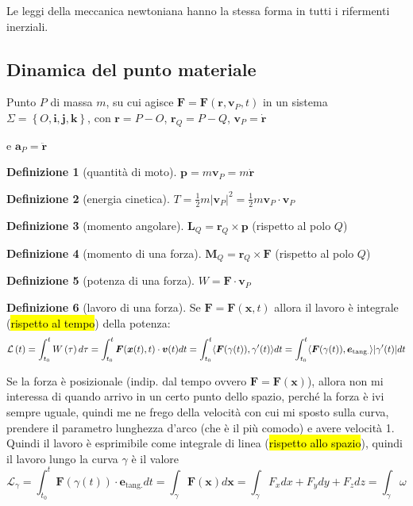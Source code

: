 \documentclass[a4paper,10pt]{article}
\theoremstyle{definition}
\newcommand{\bv}{\boldsymbol} %
\theoremstyle{indentdefinition}
\newtheorem{defn}{Definizione}[section]
\theoremstyle{indenttheorem}
\theoremstyle{myremark}
\theoremstyle{indentgeneral}
\begin{document}
Le leggi della meccanica newtoniana hanno la stessa forma in tutti
i rifermenti inerziali.

\subsection{Dinamica del punto materiale}

Punto $P$ di massa $m$, su cui agisce $\boldsymbol{F}=\boldsymbol{F}\left(\boldsymbol{r},\boldsymbol{v}_{P},t\right)$
in un sistema $\Sigma=\left\{ O,\boldsymbol{i},\boldsymbol{j},\boldsymbol{k}\right\} $,
con $\boldsymbol{r}=P-O$, $\boldsymbol{r}_Q=P-Q$, $\boldsymbol{v}_{P}=\dot{\boldsymbol{r}}$ 

e $\boldsymbol{a}_{P}=\ddot{\boldsymbol{r}}$
\begin{defn}[quantità di moto]
\label{def:quantita-di-moto}$\boldsymbol{p}=m\boldsymbol{v}_{P}=m\dot{\boldsymbol{r}}$
\end{defn}

\begin{defn}[energia cinetica]
\label{def:energia-cinetica}$T=\frac{1}{2}m\left|\boldsymbol{v}_{P}\right|^{2}=\frac{1}{2}m\boldsymbol{v}_{P}\cdot\boldsymbol{v}_{P}$
\end{defn}

\begin{defn}[momento angolare]
\label{def:momento-angolare}$\boldsymbol{L}_{Q}=\bv{r}_Q\times\bv{p}$ (rispetto al polo $Q$)
\end{defn}

\begin{defn}[momento di una forza]
\label{def:momento-forza}$\boldsymbol{M}_{Q}=\bv{r}_Q\times\boldsymbol{F}$  (rispetto al polo $Q$) 
\end{defn}

\begin{defn}[potenza di una forza]
\label{def:potenza-forza}$W=\boldsymbol{F}\cdot\boldsymbol{v}_{P}$
\end{defn}

\begin{defn}[lavoro di una forza]
\label{def:lavoro-forza}Se $\boldsymbol{F}=\boldsymbol{F}(\boldsymbol{x},t)$ allora il lavoro è integrale (\hl{rispetto al tempo}) della potenza: $$\mathcal{L}\left(t\right)=\int_{t_{0}}^{t}W\left(\tau\right)d\tau=\int_{t_{0}}^{t}\bv{F}(\boldsymbol{x}(t),t)\cdot\bv{v}(t)dt=\int_{t_0}^t\langle\bv{F}(\gamma(t)),\gamma'(t)\rangle dt=\int_{t_0}^t\langle\bv{F}(\gamma(t)),\bv{e}_{\text{tang.}}\rangle\abs{\gamma'(t)} dt$$

Se la forza è posizionale (indip. dal tempo ovvero $\boldsymbol{F}=\boldsymbol{F}(\boldsymbol{x})$), allora non mi interessa di quando arrivo in un certo punto dello spazio, perché la forza è ivi sempre uguale, quindi me ne frego della velocità con cui mi sposto sulla curva, prendere il parametro lunghezza d'arco (che è il più comodo) e avere  velocità 1. Quindi
il lavoro è esprimibile come integrale di linea (\hl{rispetto allo spazio}), quindi il lavoro lungo la curva $\gamma$ è il valore
\[
\mathcal{L}_\gamma=\int_{t_0}^t\boldsymbol{F}(\gamma(t))\cdot \bv{e}_{\text{tang.}}dt=\int_{\gamma}\boldsymbol{F}(\bv{x})d\bv{x}=\int_{\gamma}F_{x}dx+F_{y}dy+F_{z}dz=\int_{\gamma}\omega
\]
\end{defn}
\end{document}
